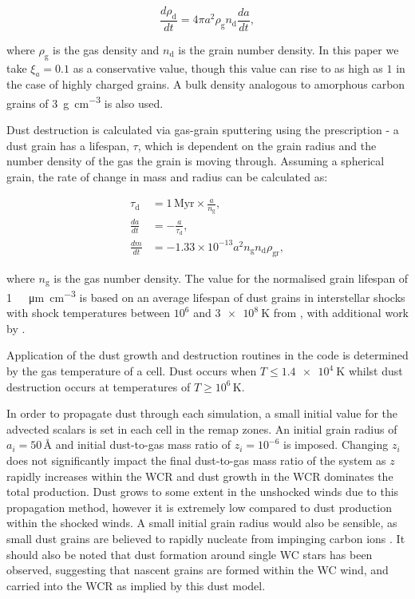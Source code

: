 \documentclass[fleqn,usenatbib]{mnras}
\begin{document}
\begin{equation}
  \frac{d\rho_\text{d}}{dt}  = 4 \pi a^2 \rho_\text{g} n_\text{d} \frac{da}{dt} , 
\end{equation}

\noindent
where $\rho_\text{g}$ is the gas density and $n_\text{d}$ is the grain number density.
In this paper we take $\xi_a = 0.1$ as a conservative value, though this value can rise to as high as $1$ in the case of highly charged grains.
A bulk density analogous to amorphous carbon grains of \SI{3}{\gram\per\centi\metre\cubed} is also used.

Dust destruction is calculated via gas-grain sputtering using the \cite{draine_destruction_1979} prescription - a dust grain has a lifespan, $\tau$, which is dependent on the grain radius and the number density of the gas the grain is moving through.
Assuming a spherical grain, the rate of change in mass and radius can be calculated as:

\begin{subequations}
  \begin{align}
    \tau_\text{d} & = 1 \, \text{Myr} \times \frac{a}{n_\text{g}} , \\
    \frac{da}{dt} & = - \frac{a}{\tau_\text{d}} , \\
    \frac{dm}{dt} & = -1.33 \times 10^{-13} a^2 n_\text{g} n_\text{d} \rho_\text{gr} ,
  \end{align}
\end{subequations}

\noindent
where $n_\text{g}$ is the gas number density.
The value for the normalised grain lifespan of \SI{1}{\mega\year\micro\metre\per\centi\metre\cubed} is based on an average lifespan of dust grains in interstellar shocks with shock temperatures between $10^6$ and $\SI{3e8}{\kelvin}$ from \cite{dwekCoolingSputteringInfrared1996}, with additional work by \cite{tielens_physics_1994}.

Application of the dust growth and destruction routines in the code is determined by the gas temperature of a cell.
Dust occurs when $T \leq \SI{1.4e4}{\kelvin}$ whilst dust destruction occurs at temperatures of $T \geq 10^6 \, \si{\kelvin}$.

In order to propagate dust through each simulation, a small initial value for the advected scalars is set in each cell in the remap zones.
An initial grain radius of $a_i = 50 \, \text{\AA}$ and initial dust-to-gas mass ratio of $z_i = 10^{-6}$ is imposed.
Changing $z_i$ does not significantly impact the final dust-to-gas mass ratio of the system as $z$ rapidly increases within the WCR and dust growth in the WCR dominates the total production.
Dust grows to some extent in the unshocked winds due to this propagation method, however it is extremely low compared to dust production within the shocked winds.
A small initial grain radius would also be sensible, as small dust grains are believed to rapidly nucleate from impinging carbon ions 
\citep{harriesThreedimensionalDustRadiativetransfer2004}.
It should also be noted that dust formation around single WC stars has been observed, suggesting that nascent grains are formed within the WC wind, and carried into the WCR as implied by this dust model.
\end{document}
